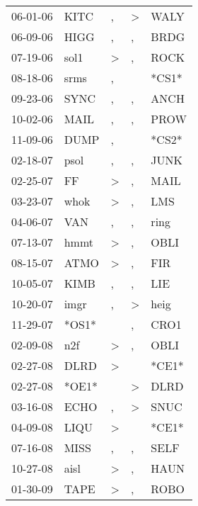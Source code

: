 \begin{supertabular}{lllll}
 06-01-06 &   KITC &                , &     \textgreater &   WALY \\
 06-09-06 &   HIGG &                , &                , &   BRDG \\
 07-19-06 &   sol1 &     \textgreater &                , &   ROCK \\
 08-18-06 &   srms &                , &                  &  *CS1* \\
 09-23-06 &   SYNC &                , &                , &   ANCH \\
 10-02-06 &   MAIL &                , &                , &   PROW \\
 11-09-06 &   DUMP &                , &                  &  *CS2* \\
 02-18-07 &   psol &                , &                , &   JUNK \\
 02-25-07 &     FF &     \textgreater &                , &   MAIL \\
 03-23-07 &   whok &     \textgreater &                , &    LMS \\
 04-06-07 &    VAN &                , &                , &   ring \\
 07-13-07 &   hmmt &     \textgreater &                , &   OBLI \\
 08-15-07 &   ATMO &     \textgreater &                , &    FIR \\
 10-05-07 &   KIMB &                , &                , &    LIE \\
 10-20-07 &   imgr &                , &     \textgreater &   heig \\
 11-29-07 &  *OS1* &                  &                , &   CRO1 \\
 02-09-08 &    n2f &     \textgreater &                , &   OBLI \\
 02-27-08 &   DLRD &     \textgreater &                  &  *CE1* \\
 02-27-08 &  *OE1* &                  &     \textgreater &   DLRD \\
 03-16-08 &   ECHO &                , &     \textgreater &   SNUC \\
 04-09-08 &   LIQU &     \textgreater &                  &  *CE1* \\
 07-16-08 &   MISS &                , &                , &   SELF \\
 10-27-08 &   aisl &     \textgreater &                , &   HAUN \\
 01-30-09 &   TAPE &     \textgreater &                , &   ROBO \\

\end{supertabular}
